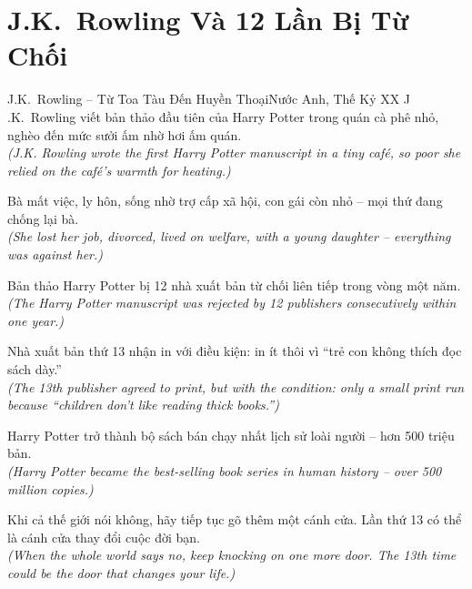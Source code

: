 \section{J.K.\ Rowling Và 12 Lần Bị Từ Chối}
\begin{truyen}{J.K.\ Rowling -- Từ Toa Tàu Đến Huyền Thoại}{Nước Anh, Thế Kỷ XX}
J .K.\ Rowling viết bản thảo đầu tiên của Harry Potter trong quán cà phê nhỏ, nghèo đến mức sưởi ấm nhờ hơi ấm quán.\\
\textit{(J.K. Rowling wrote the first Harry Potter manuscript in a tiny café, so poor she relied on the café's warmth for heating.)}

Bà mất việc, ly hôn, sống nhờ trợ cấp xã hội, con gái còn nhỏ -- mọi thứ đang chống lại bà.\\
\textit{(She lost her job, divorced, lived on welfare, with a young daughter -- everything was against her.)}

Bản thảo Harry Potter bị 12 nhà xuất bản từ chối liên tiếp trong vòng một năm.\\
\textit{(The Harry Potter manuscript was rejected by 12 publishers consecutively within one year.)}

Nhà xuất bản thứ 13 nhận in với điều kiện: in ít thôi vì ``trẻ con không thích đọc sách dày.''\\
\textit{(The 13th publisher agreed to print, but with the condition: only a small print run because ``children don't like reading thick books.'')}

Harry Potter trở thành bộ sách bán chạy nhất lịch sử loài người -- hơn 500 triệu bản.\\
\textit{(Harry Potter became the best-selling book series in human history -- over 500 million copies.)}

\end{truyen}
\begin{baihoc}
  Khi cả thế giới nói không, hãy tiếp tục gõ thêm một cánh cửa. Lần thứ 13 có thể là cánh cửa thay đổi cuộc đời bạn.\\
  \textit{(When the whole world says no, keep knocking on one more door. The 13th time could be the door that changes your life.)}
\end{baihoc}

